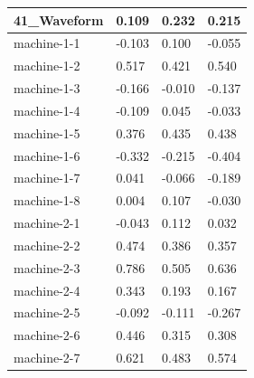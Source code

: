 \begin{table}[]
\begin{tabular}{|l|l|l|l|}
			41\_Waveform    & 0.109                        & 0.232                        & 0.215                         \\ \hline
			machine-1-1     & -0.103                       & 0.100                        & -0.055                        \\ \hline
			machine-1-2     & 0.517                        & 0.421                        & 0.540                         \\ \hline
			machine-1-3     & -0.166                       & -0.010                       & -0.137                        \\ \hline
			machine-1-4     & -0.109                       & 0.045                        & -0.033                        \\ \hline
			machine-1-5     & 0.376                        & 0.435                        & 0.438                         \\ \hline
			machine-1-6     & -0.332                       & -0.215                       & -0.404                        \\ \hline
			machine-1-7     & 0.041                        & -0.066                       & -0.189                        \\ \hline
			machine-1-8     & 0.004                        & 0.107                        & -0.030                        \\ \hline
			machine-2-1     & -0.043                       & 0.112                        & 0.032                         \\ \hline
			machine-2-2     & 0.474                        & 0.386                        & 0.357                         \\ \hline
			machine-2-3     & 0.786                        & 0.505                        & 0.636                         \\ \hline
			machine-2-4     & 0.343                        & 0.193                        & 0.167                         \\ \hline
			machine-2-5     & -0.092                       & -0.111                       & -0.267                        \\ \hline
			machine-2-6     & 0.446                        & 0.315                        & 0.308                         \\ \hline
			machine-2-7     & 0.621                        & 0.483                        & 0.574                         \\ \hline

\end{tabular}
\end{table}
